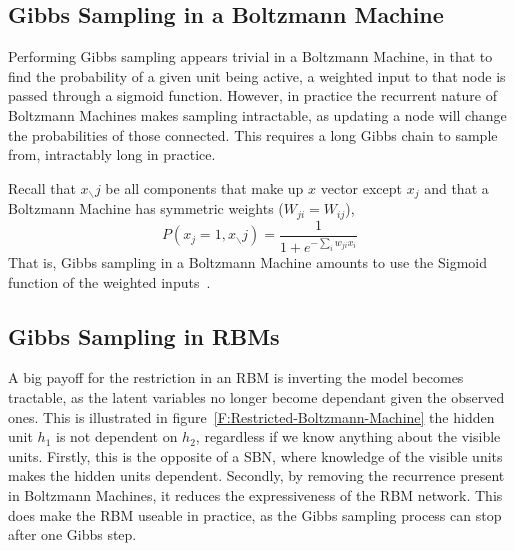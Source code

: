 \subsection{Gibbs Sampling in a Boltzmann Machine}

Performing Gibbs sampling appears trivial in a Boltzmann Machine, in that to find the probability of a given unit being active, a weighted input to that node is passed through a sigmoid function. However, in practice the recurrent nature of Boltzmann Machines makes sampling intractable, as updating a node will change the probabilities of those connected. This requires a long Gibbs chain to sample from, intractably long in practice.

Recall that $ x_{\smallsetminus} j$ be all components that make up $x$ vector except $x_j$ and that a Boltzmann Machine has symmetric weights ($ W_{ji} = W_{ij} $),
$$
P(x_j = 1, x_{\smallsetminus}j) = \frac{1}{1 + e^{-\sum_i w_{ji}x_i}}
$$
That is, Gibbs sampling in a Boltzmann Machine amounts to use the Sigmoid function of the weighted inputs~\cite{neal1992:connectionist}.

\subsection{Gibbs Sampling in RBMs}\label{S:Gibbs-Sampling-RBM}


A big payoff for the restriction in an RBM is inverting the model becomes tractable, as the latent variables no longer become dependant given the observed ones. This is illustrated in figure~\ref{F:Restricted-Boltzmann-Machine} the hidden unit $h_1$ is not dependent on $h_2$, regardless if we know anything about the visible units. Firstly, this is the opposite of a SBN, where knowledge of the visible units makes the hidden units dependent. Secondly, by removing the recurrence present in Boltzmann Machines, it reduces the expressiveness of the RBM network. This does make the RBM useable in practice, as the Gibbs sampling process can stop after one Gibbs step\cite{fischer2014training}.

